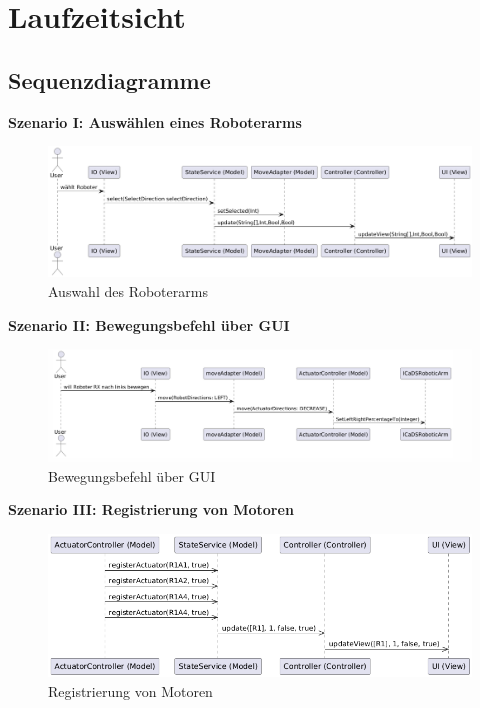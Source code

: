 
\chapter{Laufzeitsicht}

\section{Sequenzdiagramme}
\textbf{Szenario I: Auswählen eines Roboterarms}\\

\begin{figure}[h]
    \centering
    \includegraphics[width=0.8\linewidth]{diagrams/select_befehl_16_7.png}
    \caption{Auswahl des Roboterarms}
    \label{fig:Auswahl}
\end{figure}

\clearpage\textbf{Szenario II: Bewegungsbefehl über GUI}\\

\begin{figure}[h]  
    \centering
    \includegraphics[width=0.8\linewidth]{diagrams/moveBefehl250625.png}
    \caption{Bewegungsbefehl über GUI}
    \label{fig:Bewegungsbefehl}
\end{figure}

\clearpage\textbf{Szenario III: Registrierung von Motoren}\\

\begin{figure}[h]  
    \centering
    \includegraphics[width=0.8\linewidth]{diagrams/register_16_7.png}
    \caption{Registrierung von Motoren}
    \label{fig:Registrierung}
\end{figure}




